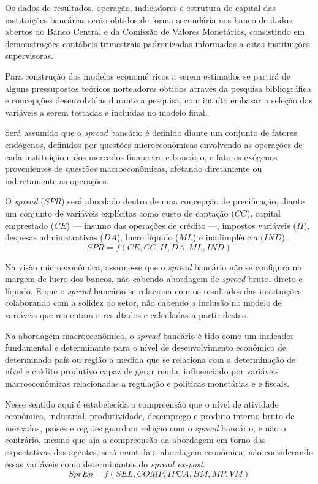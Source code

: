 \documentclass[12pt,openright,oneside,a4paper,chapter=TITLE,section=TITLE,subsection=TITLE,english,french,spanish,portugues,sumario=tradicional]{abntex2}
\begin{document}
Os dados de resultados, operação, indicadores e estrutura de capital das instituições bancárias serão obtidos de forma secundária nos banco de dados abertos do Banco Central e da Comissão de Valores Monetários, consistindo em demonstrações contábeis trimestrais padronizadas informadas a estas instituições supervisoras.

Para construção dos modelos econométricos a serem estimados se partirá de alguns pressupostos teóricos norteadores obtidos através da pesquisa bibliográfica e concepções desenvolvidas durante a pesquisa, com intuíto embasar a seleção das variáveis a serem testadas e incluídas no modelo final.

Será assumido que o \emph{spread} bancário é definido diante um conjunto de fatores endógenos, definidos por questões microeconômicas envolvendo as operações de cada instituição e dos mercados financeiro e bancário, e fatores exógenos provenientes de questões macroeconômicas, afetando diretamente ou indiretamente as operações.

O \emph{spread} (\(SPR\)) será abordado dentro de uma concepção de precificação, diante um conjunto de variáveis explícitas como custo de captação (\(CC\)), capital emprestado (\(CE\)) --- insumo das operações de crédito ---, impostos variáveis (\(II\)), despesas administrativas (\(DA\)), lucro líquido (\(ML\)) e inadimplência (\(IND\)).
\[
SPR = f(CE,CC,II,DA,ML,IND)
\]

Na visão microeconômica, assume-se que o \emph{spread} bancário não se configura na margem de lucro dos bancos, não cabendo abordagem de \emph{spread} bruto, direto e líquido. E que o \emph{spread} bancário se relaciona com os resultados das instituições, colaborando com a solidez do setor, não cabendo a inclusão no modelo de variáveis que rementam a resultados e calculadas a partir destas.

Na abordagem macroeconômica, o \emph{spread} bancário é tido como um indicador fundamental e determinante para o nível de desenvolvimento econômico de determinado país ou região a medida que se relaciona com a determinação de nível e crédito produtivo capaz de gerar renda, influenciado por variáveis macroeconômicas relacionadas a regulação e políticas monetárias e e fiscais.

Nesse sentido aqui é estabelecida a compreensão que o nível de atividade econômica, industrial, produtividade, desemprego e produto interno bruto de mercados, países e regiões guardam relação com o \emph{spread} bancário, e não o contrário, mesmo que aja a compreensão da abordagem em torno das expectativas dos agentes, será mantida a abordagem econômica, não considerando essas variáveis como determinantes do \emph{spread ex-post}.
\[
SprEp = f(SEL,COMP,IPCA,BM,MP,VM)
\]
\end{document}
